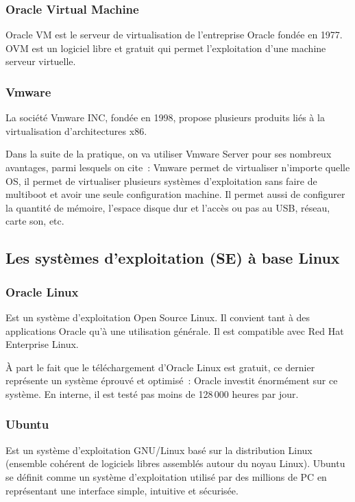 \documentclass[12pt,a4paper]{report}
\begin{document}
\subsubsection{Oracle Virtual Machine}

Oracle VM est le serveur de virtualisation de l'entreprise Oracle fondée en 1977.
OVM est un logiciel libre et gratuit qui permet l'exploitation d'une machine
serveur virtuelle.

\subsubsection{Vmware}

La société Vmware INC, fondée en 1998, propose plusieurs produits liés à la
virtualisation d'architectures x86.

Dans la suite de la pratique, on va utiliser Vmware Server pour ses nombreux
avantages, parmi lesquels on cite~: Vmware permet de virtualiser n'importe quelle
OS, il permet de virtualiser plusieurs systèmes d'exploitation sans faire de
multiboot et avoir une seule configuration machine. Il permet aussi de configurer
la quantité de mémoire, l'espace disque dur et l'accès ou pas au USB, réseau, carte
son, etc.

\subsection{Les systèmes d'exploitation (SE) à base Linux}

\subsubsection{Oracle Linux}

Est un système d'exploitation Open Source Linux. Il convient tant à des
applications Oracle qu'à une utilisation générale. Il est compatible avec Red Hat
Enterprise Linux.

À part le fait que le téléchargement d'Oracle Linux est gratuit, ce dernier
représente un système éprouvé et optimisé~: Oracle investit énormément sur ce
système. En interne, il est testé pas moins de 128\,000 heures par jour.

\subsubsection{Ubuntu}

Est un système d'exploitation GNU/Linux basé sur la distribution Linux (ensemble
cohérent de logiciels libres assemblés autour du noyau Linux). Ubuntu se définit
comme un système d'exploitation utilisé par des millions de PC en représentant une
interface simple, intuitive et sécurisée.
\end{document}
